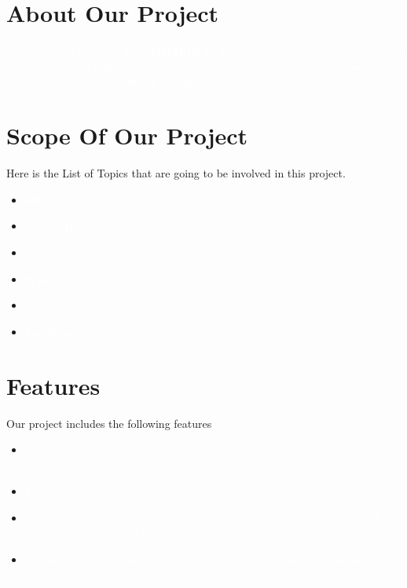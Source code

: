 \documentclass{article}
\begin{document}
\section{About Our Project}
\begin{tcolorbox}[colback=blue!60!white,colframe=blue!50!black]
\textcolor{white}{
Our project is based on \textbf{E-COMMERCE}. E-commerce (or electronic commerce) is the buying and selling of goods or services on the Internet. It encompasses a wide variety of \textbf{data, systems} and \textbf{tools} for online buyers and sellers.}
\end{tcolorbox}
\section{Scope Of Our Project}
Here is the List of Topics that are going to be involved in this project.
\begin{tcolorbox}[colback=blue!60!white,colframe=blue!50!black]
\begin{itemize}
\item[\textcolor{white}{\textbullet}] \texttt{\textcolor{white}{HTML}}
\item[\textcolor{white}{\textbullet}] \texttt{\textcolor{white}{Javascript}}
\item[\textcolor{white}{\textbullet}] \texttt{\textcolor{white}{Php}}
\item[\textcolor{white}{\textbullet}] \texttt{\textcolor{white}{MySQL}}
\item[\textcolor{white}{\textbullet}] \texttt{\textcolor{white}{CSS}}
\item[\textcolor{white}{\textbullet}] \texttt{\textcolor{white}{BootStrap}}
\end{itemize}
\end{tcolorbox}
\section{Features}
Our project includes the following features
\begin{tcolorbox}[colback=blue!60!white,colframe=blue!50!black]
\begin{itemize}
\item[\textcolor{white}{\textbullet}] \textrm{\textcolor{white}{Our Project welcomes you by showing all the products that are available 
to buy online.}}
\item[\textcolor{white}{\textbullet}]\textrm{\textcolor{white}{You need to sign-in first to select items if you wish to buy them.}}
\item[\textcolor{white}{\textbullet}] \textrm{\textcolor{white}{There would be a search button which make the customer to easily search
for the things they want to buy.}}
\item[\textcolor{white}{\textbullet}] \textrm{\textcolor{white}{All the items you choose to buy will be listed which makes the addition and deletion of products you buy Easy }}

\end{itemize}
\end{tcolorbox}
\end{document}
